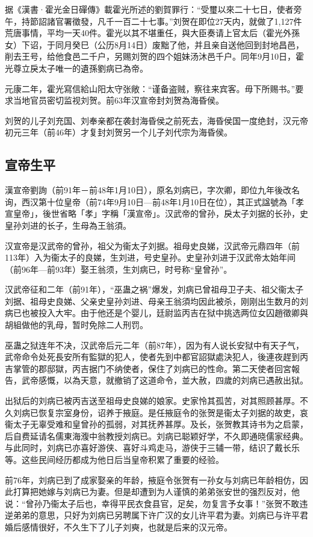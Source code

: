 据《漢書·霍光金日磾傳》載霍光所述的劉賀罪行：“受璽以來二十七日，使者旁午，持節詔諸官署徵發，凡千一百二十七事。”刘贺在即位27天内，就做了1,127件荒唐事情，平均一天40件。霍光以其不堪重任，與大臣奏请上官太后（霍光外孫女）下诏，于同月癸巳（公历8月14日）废黜了他，并且亲自送他回到封地昌邑，削去王号，给他食邑二千户，另赐刘贺的四个姐妹汤沐邑千户。同年9月10日，霍光尊立戾太子唯一的遺孫劉病已為帝。

元康二年，霍光寫信給山阳太守张敞：“谨备盗贼，察往来宾客。毋下所赐书。”要求当地官员密切监视刘贺。前63年汉宣帝封刘贺為海昏侯。

刘贺的儿子刘充国、刘奉亲都在袭封海昏侯之前死去，海昏侯国一度绝封，汉元帝初元三年（前46年）才复封刘贺另一个儿子刘代宗为海昏侯。

\subsection{宣帝生平}

漢宣帝劉詢（前91年－前48年1月10日），原名刘病已，字次卿，即位九年後改名询，西汉第十位皇帝（前74年9月10日—前48年1月10日在位），其正式諡號為「孝宣皇帝」，後世省略「孝」字稱「漢宣帝」。汉武帝的曾孙，戾太子刘据的长孙，史皇孙刘进的长子，生母為王翁須。

汉宣帝是汉武帝的曾孙，祖父为衞太子刘据。祖母史良娣，汉武帝元鼎四年（前113年）入为衞太子的良娣，生刘进，号史皇孙。史皇孙刘进于汉武帝太始年间（前96年—前93年）娶王翁须，生刘病已，时号称“皇曾孙”。

汉武帝征和二年（前91年），“巫蛊之祸”爆发，刘病已曾祖母卫子夫、祖父衞太子刘据、祖母史良娣、父亲史皇孙刘进、母亲王翁須均因此被杀，刚刚出生数月的刘病已也被投入大牢。由于他还是个婴儿，廷尉监丙吉在狱中挑选两位女囚趙徵卿與胡組做他的乳母，暂时免除二人刑罚。

巫蛊之狱连年不决，汉武帝后元二年（前87年），因为有人说长安狱中有天子气，武帝命令处死長安所有監獄的犯人，使者先到中都官詔獄處決犯人，後連夜趕到丙吉掌管的郡邸獄，丙吉据门不纳使者，保住了刘病已的性命。第二天使者回宮報告，武帝感慨，以為天意，就撤销了这道命令，並大赦，四歲的刘病已遇赦出狱。

出狱后的刘病已被丙吉送至祖母史良娣的娘家。史家怜其孤苦，对其照顾甚厚。不久刘病已恢复宗室身份，诏养于掖庭。是任掖庭令的张贺是衞太子刘据的故吏，哀衞太子无辜受难和皇曾孙的孤弱，对其抚养甚厚。及长，张贺教其诗书为之启蒙，后自费延请名儒東海澓中翁教授刘病已。刘病已聪颖好学，不久即通晓儒家经典。与此同时，刘病已亦喜好游侠、喜好斗鸡走马，游侠于三辅一带，结识了戴长乐等。这些民间经历都成为他日后当皇帝积累了重要的经验。

前76年，刘病已到了成家娶亲的年龄，掖庭令张贺有一孙女与刘病已年龄相仿，因此打算把她嫁与刘病已为妻。但是却遭到为人谨慎的弟弟张安世的强烈反对，他说：“曾孙乃衞太子后也，幸得平民衣食县官，足矣，勿复言予女事！”张贺不敢违逆弟弟的意思，只好为刘病已另聘属下许广汉的女儿许平君为妻。刘病已与许平君婚后感情很好，不久生下了儿子刘奭，也就是后来的汉元帝。


